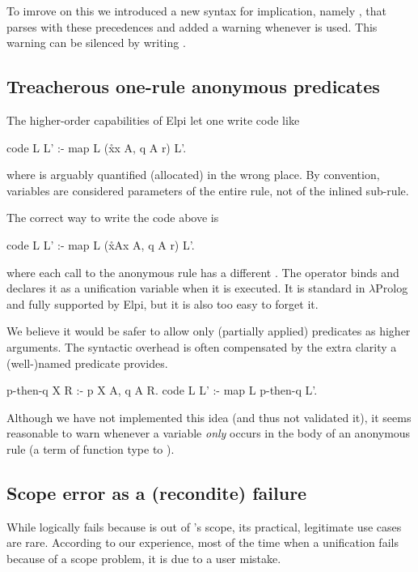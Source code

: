 \documentclass[a4paper, 11pt]{book}
\begin{document}
To imrove on this we introduced a new syntax for implication, namely \elpi{==>},
that parses with these precedences and added a
warning whenever  is used. This warning can be silenced by
writing .

\subsection{Treacherous one-rule anonymous predicates}

The higher-order capabilities of Elpi let one write code like
\begin{elpicode}
code L L' :- map L (x\r\p x A, q A r) L'.
\end{elpicode}
where  is arguably quantified (allocated) in the wrong place. By
convention, variables are considered parameters of the entire rule, not of the
inlined sub-rule.

The correct way to write the code above is
\begin{elpicode}
code L L' :- map L (x\r\sigma A\p x A, q A r) L'.
\end{elpicode}
where each call to the anonymous rule has a different .
The  operator binds  and declares it as
a unification variable when it is executed. It is standard in
$\lambda$Prolog and fully supported by Elpi, but it is also
too easy to forget it.

We believe it would
be safer to allow only (partially applied) predicates as
higher arguments. The syntactic overhead is often compensated by the extra
clarity a (well-)named predicate provides.

\begin{elpicode}
p-then-q X R :- p X A, q A R.
code L L' :- map L p-then-q L'.
\end{elpicode}
Although we have not implemented this idea (and thus not validated it), it
seems reasonable to warn whenever a variable \emph{only} occurs in the body of
an anonymous rule (a term of function type to ).

\subsection{Scope error as a (recondite) failure}

While  logically fails because  is out of 's
scope, its
practical, legitimate use cases are rare. According to our experience, most
of the time when a unification fails because of a scope problem, it is due to
a user mistake.
\end{document}
